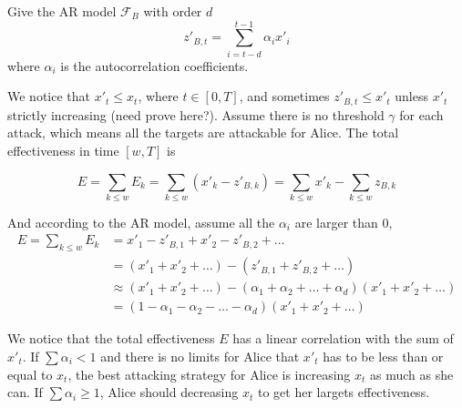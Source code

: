 \documentclass[journal]{IEEEtran}
\begin{document}
{Give the AR model $\mathcal{F}_B$ with order $d$
\begin{equation}
    z'_{B,t}=\sum_{i=t-d}^{t-1}\alpha_i x'_i
\end{equation}
where $\alpha_i$ is the autocorrelation coefficients. 

We notice that $x'_t\leq x_t$, where $t\in[0, T]$, and sometimes $z'_{B,t}\leq x'_t$ unless $x'_t$ strictly increasing (need prove here?). Assume there is no threshold $\gamma$ for each attack, which means all the targets are attackable for Alice. The total effectiveness in time $[w,T]$ is

\begin{equation}
	E=\sum_{k\leq w} E_{k}=\sum_{k\leq w} (x'_{k}-z'_{B,k})=\sum_{k\leq w} x'_{k}-\sum_{k\leq w} z_{B,k}
\end{equation}



And according to the AR model, assume all the $\alpha_i$ are larger than $0$,
\begin{equation}
\begin{aligned}
    E=\sum_{k\leq w} E_{k}&=x'_1 - z'_{B,1} + x'_2 - z'_{B,2} + \dots\\
                      &=(x'_1 + x'_2 + \dots) - (z'_{B,1} + z'_{B,2} + \dots)\\
                      &\approx(x'_1 + x'_2 + \dots) - (\alpha_1+\alpha_2+\dots+\alpha_d)(x'_1+x'_2+\dots)\\
                      &=(1-\alpha_1-\alpha_2-\dots-\alpha_d)(x'_1 + x'_2 + \dots)
\end{aligned}
\end{equation}

We notice that the total effectiveness $E$ has a linear correlation with the sum of $x'_t$. If $\sum{\alpha_i}<1$ and there is no limits for Alice that $x'_t$ has to be less than or equal to $x_t$, the best attacking strategy for Alice is increasing $x_t$ as much as she can. If $\sum{\alpha_i}\geq 1$, Alice should decreasing $x_t$ to get her largets effectiveness.


}
\end{document}
